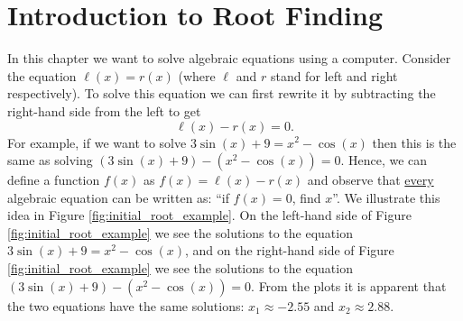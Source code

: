 \newpage
\section{Introduction to Root Finding}
In this chapter we want to solve algebraic equations using a computer.  Consider the equation
$\ell(x) = r(x)$ (where $\ell$ and $r$ stand for left and right respectively).  To solve
this equation we can first rewrite it by subtracting the right-hand side from the left to
get
\[ \ell(x) - r(x) = 0. \]
For example, if we want to solve $3\sin(x) + 9 = x^2 - \cos(x)$ then this is the same as
solving $(3\sin(x) + 9 ) - (x^2 - \cos(x)) = 0$.  Hence, we can define a function $f(x)$
as $f(x)=\ell(x)-r(x)$
and observe that \underline{every} algebraic equation can be written as: ``if $f(x) = 0$,
find $x$''.  We illustrate this idea in Figure \ref{fig:initial_root_example}.  On the
left-hand side of Figure \ref{fig:initial_root_example} we see the solutions to the
equation $3\sin(x) + 9 = x^2 - \cos(x)$, and on the right-hand side of Figure
\ref{fig:initial_root_example} we see the solutions to the equation $\left( 3\sin(x)+9
\right) - \left( x^2 - \cos(x) \right) = 0$.  From the plots it is apparent that the two
equations have the same solutions: $x_1 \approx -2.55$ and $x_2 \approx 2.88$.

